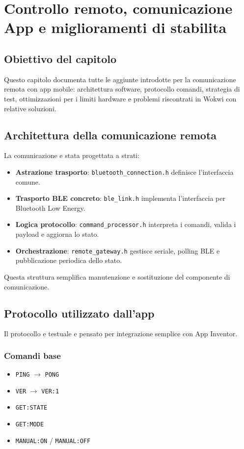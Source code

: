 \chapter{Controllo remoto, comunicazione App e miglioramenti di stabilita}

\section{Obiettivo del capitolo}
Questo capitolo documenta tutte le aggiunte introdotte per la comunicazione remota con app mobile: architettura software, protocollo comandi, strategia di test, ottimizzazioni per i limiti hardware e problemi riscontrati in Wokwi con relative soluzioni.

\section{Architettura della comunicazione remota}
La comunicazione e stata progettata a strati:

\begin{itemize}
  \item \textbf{Astrazione trasporto}: \texttt{bluetooth\_connection.h} definisce l'interfaccia comune.
  \item \textbf{Trasporto BLE concreto}: \texttt{ble\_link.h} implementa l'interfaccia per Bluetooth Low Energy.
  \item \textbf{Logica protocollo}: \texttt{command\_processor.h} interpreta i comandi, valida i payload e aggiorna lo stato.
  \item \textbf{Orchestrazione}: \texttt{remote\_gateway.h} gestisce seriale, polling BLE e pubblicazione periodica dello stato.
\end{itemize}

Questa struttura semplifica manutenzione e sostituzione del componente di comunicazione.

\section{Protocollo utilizzato dall'app}
Il protocollo e testuale e pensato per integrazione semplice con App Inventor.

\subsection{Comandi base}
\begin{itemize}
  \item \texttt{PING} $\rightarrow$ \texttt{PONG}
  \item \texttt{VER} $\rightarrow$ \texttt{VER:1}
  \item \texttt{GET:STATE}
  \item \texttt{GET:MODE}
  \item \texttt{MANUAL:ON} / \texttt{MANUAL:OFF}
\end{itemize}

